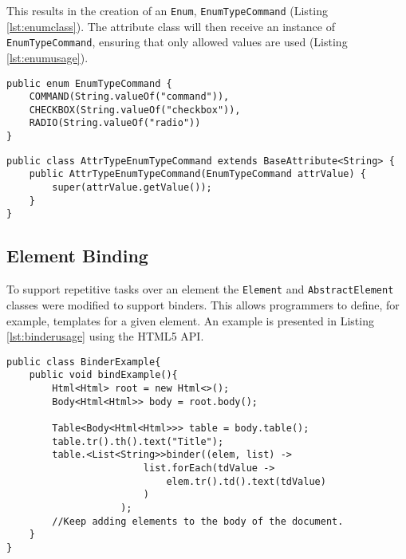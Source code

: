 \newpage

\noindent
This results in the creation of an \texttt{Enum}, \texttt{EnumTypeCommand} (Listing \ref{lst:enumclass}). The attribute class will then receive an instance of \texttt{EnumTypeCommand}, ensuring that only allowed values are used (Listing \ref{lst:enumusage}).

\bigskip


\begin{minipage}{\linewidth}
\begin{lstlisting}[caption={Enumeration Class},label={lst:enumclass}]
public enum EnumTypeCommand {
    COMMAND(String.valueOf("command")), 
    CHECKBOX(String.valueOf("checkbox")),
    RADIO(String.valueOf("radio"))
}
\end{lstlisting}
\end{minipage}


\begin{minipage}{\linewidth}
\begin{lstlisting}[caption={Attribute Receiving An Enumeration},label={lst:enumusage}]
public class AttrTypeEnumTypeCommand extends BaseAttribute<String> {
    public AttrTypeEnumTypeCommand(EnumTypeCommand attrValue) {
        super(attrValue.getValue());
    }
}
\end{lstlisting}
\end{minipage}

\subsection{Element Binding}
\label{sec:elementbinding}

\noindent
To support repetitive tasks over an element the \texttt{Element} and \texttt{AbstractElement} classes were modified to support binders. This allows programmers to define, for example, templates for a given element. An example is presented in Listing \ref{lst:binderusage} using the \ac{HTML}5 \ac{API}.

\bigskip


\begin{minipage}{\linewidth}
\begin{lstlisting}[caption={Binder Usage Example},label={lst:binderusage}]
public class BinderExample{
    public void bindExample(){
        Html<Html> root = new Html<>();
        Body<Html<Html>> body = root.body();
        
        Table<Body<Html<Html>>> table = body.table();
        table.tr().th().text("Title");
        table.<List<String>>binder((elem, list) ->
                        list.forEach(tdValue ->
                            elem.tr().td().text(tdValue)
                        )
                    );
        //Keep adding elements to the body of the document.
    }
}
\end{lstlisting}
\end{minipage}

